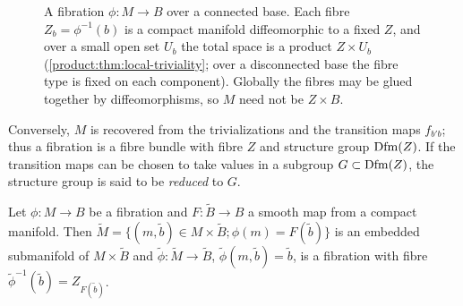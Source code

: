\begin{figure}[ht]
\centering
{}
\caption{A fibration $\phi:M\to B$ over a connected base. Each fibre
$Z_b=\phi^{-1}(b)$ is a compact manifold diffeomorphic to a fixed $Z$, and over a
small open set $U_b$ the total space is a product $Z\times U_b$
(\cref{product:thm:local-triviality}; over a disconnected base the fibre type is
fixed on each component). Globally the fibres may
be glued together by diffeomorphisms, so $M$ need not be $Z\times B$.}
\label{product:fig:fibration}
\end{figure}

Conversely, $M$ is recovered from the trivializations and the transition maps
$f_{b'b}$; thus a fibration is a fibre bundle with fibre $Z$ and structure group
$\operatorname{Dfm}(Z)$. If the transition maps can be chosen to take values in a subgroup
$G\subset\operatorname{Dfm}(Z)$, the structure group is said to be \emph{reduced} to $G$.

\begin{proposition}\label{product:prop:pullback}
Let $\phi:M\longrightarrow B$ be a fibration and $F:\tilde B\longrightarrow B$ a
smooth map from a compact manifold. Then
$\tilde M=\{(m,\tilde b)\in M\times\tilde B;\phi(m)=F(\tilde b)\}$ is an embedded
submanifold of $M\times\tilde B$ and $\tilde\phi:\tilde M\longrightarrow\tilde
B$, $\tilde\phi(m,\tilde b)=\tilde b$, is a fibration with fibre
$\tilde\phi^{-1}(\tilde b)=Z_{F(\tilde b)}$.
\end{proposition}


